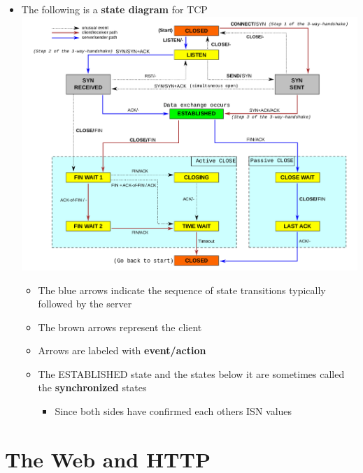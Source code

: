 \documentclass[11pt]{article}
\makeatletter
\def\maxwidth{\ifdim\Gin@nat@width>\linewidth\linewidth
    \else\Gin@nat@width\fi}
\let\Oldincludegraphics\includegraphics
\renewcommand{\includegraphics}[1]{\Oldincludegraphics[width=.8\maxwidth]{#1}}
\providecommand{\tightlist}{%
      \setlength{\itemsep}{0pt}\setlength{\parskip}{0pt}}
\makeatother
\begin{document}
\begin{itemize}
\tightlist
\item
  The following is a \textbf{state diagram} for TCP
  \includegraphics{img/tcp_state.png}

  \begin{itemize}
  \tightlist
  \item
    The blue arrows indicate the sequence of state transitions typically
    followed by the server
  \item
    The brown arrows represent the client
  \item
    Arrows are labeled with \textbf{event/action}
  \item
    The ESTABLISHED state and the states below it are sometimes called
    the \textbf{synchronized} states

    \begin{itemize}
    \tightlist
    \item
      Since both sides have confirmed each others ISN values
    \end{itemize}
  \end{itemize}
\end{itemize}

    \section{The Web and HTTP}\label{the-web-and-http}
\end{document}
